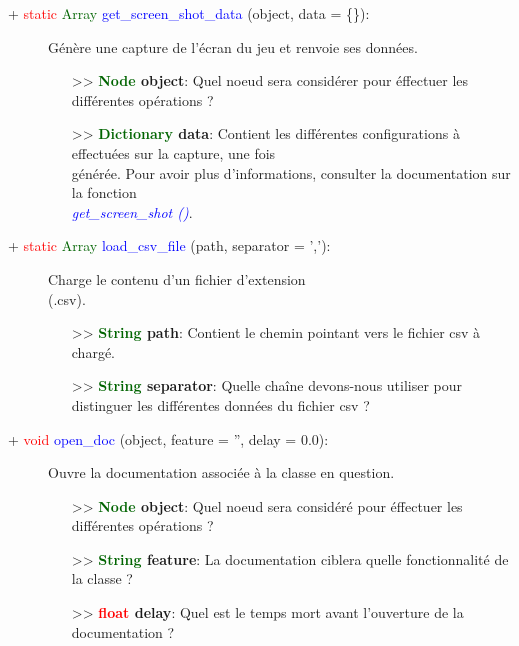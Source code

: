 \documentclass[a4paper, 11pt]{article}
\begin{document}
	\begin{description}
		\item [+ \textcolor{red}{static} \textcolor{darkgreen}{Array} \textcolor{blue}
		{get\_screen\_shot\_data} (object, data = \{\}):] Génère une capture de l'écran du jeu et renvoie 
		ses données.
		\begin{itemize}
			\item [>> \textbf{\textcolor{darkgreen}{Node} object}:] Quel noeud sera considérer pour 
			éffectuer les différentes opérations ?
			\item [>> \textbf{\textcolor{darkgreen}{Dictionary} data}:] Contient les différentes
			configurations à effectuées sur la capture, une fois \\générée. Pour avoir plus d'informations,
			consulter la documentation sur la fonction \textit{\textcolor{blue}{\\get\_screen\_shot ()}}.\\
		\end{itemize}
	\end{description}
	\begin{description}
		\item [+ \textcolor{red}{static} \textcolor{darkgreen}{Array} \textcolor{blue}{load\_csv\_file}
		(path, separator = ','):] Charge le contenu d'un fichier d'extension \\(.csv).
		\begin{itemize}
			\item [>> \textbf{\textcolor{darkgreen}{String} path}:] Contient le chemin pointant vers le
			fichier csv à chargé.
			\item [>> \textbf{\textcolor{darkgreen}{String} separator}:] Quelle chaîne devons-nous utiliser
			pour distinguer les différentes données du fichier csv ?\\
		\end{itemize}
	\end{description}
	\begin{description}
		\item [+ \textcolor{red}{void} \textcolor{blue}{open\_doc} (object, feature = '', delay = 0.0):]
		Ouvre la documentation associée à la classe en question.
		\begin{itemize}
			\item[>> \textbf{\textcolor{darkgreen}{Node} object}:] Quel noeud sera considéré pour éffectuer
			les différentes opérations ?
			\item[>> \textbf{\textcolor{darkgreen}{String} feature}:] La documentation ciblera quelle
			fonctionnalité de la classe ?
			\item[>> \textbf{\textcolor{red}{float} delay}:] Quel est le temps mort avant l'ouverture de la
			documentation ?
		\end{itemize}
	\end{description}
\end{document}
